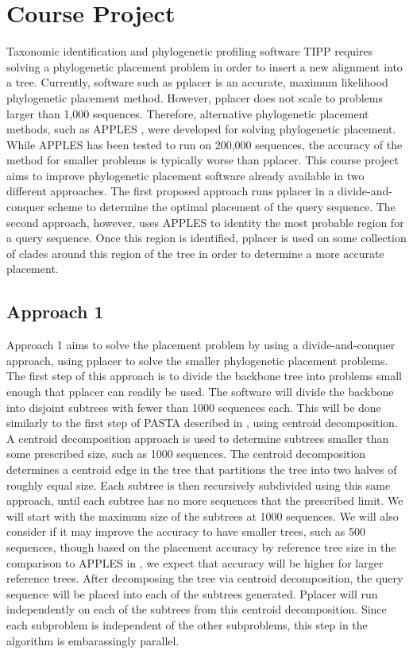\documentclass[10pt]{article}
\begin{document}
\section{Course Project}

Taxonomic identification and phylogenetic profiling software TIPP
\cite{nguyen_tipp_2014} requires solving a phylogenetic placement problem in order to
insert a new alignment into a tree. Currently, software such as pplacer
\cite{matsen_pplacer_2010} is an accurate, maximum likelihood phylogenetic placement
method. However, pplacer does not scale to problems larger than 1,000
sequences. Therefore, alternative phylogenetic placement methods, such
as APPLES \cite{balaban_apples_2020}, were developed for solving phylogenetic placement.
While APPLES has been tested to run on 200,000 sequences, the accuracy
of the method for smaller problems is typically worse than pplacer. This
course project aims to improve phylogenetic placement software already
available in two different approaches. The first proposed approach runs
pplacer in a divide-and-conquer scheme to determine the optimal
placement of the query sequence. The second approach, however, uses
APPLES to identity the most probable region for a query sequence. Once
this region is identified, pplacer is used on some collection of clades
around this region of the tree in order to determine a more accurate
placement.

\subsection{Approach 1}

Approach 1 aims to solve the placement problem by using a
divide-and-conquer approach, using pplacer to solve the smaller
phylogenetic placement problems. The first step of this approach is to
divide the backbone tree into problems small enough that pplacer can
readily be used. The software will divide the backbone into disjoint
subtrees with fewer than 1000 sequences each. This will be done
similarly to the first step of PASTA described in \cite{PASTA}, using
centroid decomposition. A centroid decomposition approach is used to
determine subtrees smaller than some prescribed size, such as 1000
sequences. The centroid decomposition determines a centroid edge in the
tree that partitions the tree into two halves of roughly equal size.
Each subtree is then recursively subdivided using this same approach,
until each subtree has no more sequences that the prescribed limit. We
will start with the maximum size of the subtrees at 1000 sequences. We
will also consider if it may improve the accuracy to have smaller trees,
such as 500 sequences, though based on the placement accuracy by
reference tree size in the comparison to APPLES in \cite{balaban_apples_2020}, we expect
that accuracy will be higher for larger reference trees. After
decomposing the tree via centroid decomposition, the query sequence will
be placed into each of the subtrees generated. Pplacer will run
independently on each of the subtrees from this centroid decomposition.
Since each subproblem is independent of the other subproblems, this step
in the algorithm is embarassingly parallel.
\end{document}
